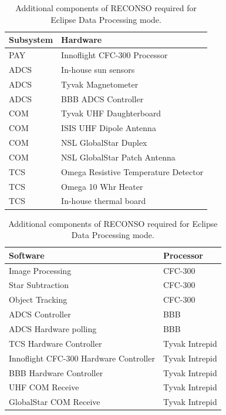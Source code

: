 \documentclass{article}
\begin{document}
\begin{table}[h!]
\caption{Additional components of RECONSO required for Eclipse Data Processing mode.}
\begin{adjustbox}{center}
\begin{tabular}{|l|l|}
\hline
Subsystem & Hardware \\ \hline \hline
PAY & Innoflight CFC-300 Processor  \\ \hline \hline
ADCS & In-house sun sensors  \\ \hline
ADCS & Tyvak Magnetometer \\ \hline
ADCS & BBB ADCS Controller \\ \hline \hline
COM & Tyvak UHF Daughterboard  \\ \hline
COM & ISIS UHF Dipole Antenna  \\ \hline
COM & NSL GlobalStar Duplex  \\ \hline
COM & NSL GlobalStar Patch Antenna \\ \hline \hline
TCS & Omega Resistive Temperature Detector \\ \hline
TCS & Omega 10 Whr Heater  \\ \hline
TCS & In-house thermal board \\ \hline
\end{tabular}

\quad

\begin{tabular}{|l|l|}
\hline
Software & Processor \\ \hline \hline
Image Processing & CFC-300 \\ \hline
Star Subtraction & CFC-300 \\ \hline
Object Tracking & CFC-300 \\ \hline \hline
ADCS Controller & BBB \\ \hline
ADCS Hardware polling & BBB \\ \hline \hline
TCS Hardware Controller & Tyvak Intrepid \\ \hline
Innoflight CFC-300 Hardware Controller & Tyvak Intrepid \\ \hline
BBB Hardware Controller & Tyvak Intrepid \\ \hline
UHF COM Receive & Tyvak Intrepid \\ \hline
GlobalStar COM Receive & Tyvak Intrepid \\ \hline
\end{tabular}
\end{adjustbox}
\end{table}
\end{document}
